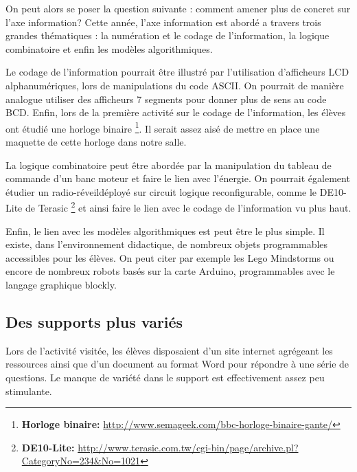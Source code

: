 \documentclass[pdftex,a4paper,12pt]{article}
\begin{document}
	On peut alors se poser la question suivante : comment amener plus de concret sur l'axe information?
	Cette année, l'axe information est abordé a travers trois grandes thématiques : la numération et le codage de l'information, la logique combinatoire 
	et enfin les modèles algorithmiques.

	Le codage de l'information pourrait être illustré par l'utilisation d'afficheurs LCD alphanumériques, lors de manipulations du code ASCII.
	On pourrait de manière analogue utiliser des afficheurs 7 segments pour donner plus de sens au code BCD.
	Enfin, lors de la première activité sur le codage de l'information, les élèves ont étudié une horloge binaire 
	\footnote{\textbf{Horloge binaire:} \url{http://www.semageek.com/bbc-horloge-binaire-gante/}}.
	Il serait assez aisé de mettre en place une maquette de cette horloge dans notre salle.

	La logique combinatoire peut être abordée par la manipulation du tableau de commande d'un banc moteur et faire le lien avec l'énergie.
	On pourrait également étudier un \og{}radio-réveil\fg{}déployé sur circuit logique reconfigurable, comme le DE10-Lite de Terasic 
	\footnote{\textbf{DE10-Lite:} \url{http://www.terasic.com.tw/cgi-bin/page/archive.pl?CategoryNo=234&No=1021}}
	et ainsi faire le lien avec le codage de l'information vu plus haut.

	Enfin, le lien avec les modèles algorithmiques est peut être le plus simple. 
	Il existe, dans l'environnement didactique, de nombreux objets programmables accessibles pour les élèves.
	On peut citer par exemple les Lego Mindstorms ou encore de nombreux robots basés sur la carte Arduino, programmables avec le langage graphique blockly.

	\subsection{Des supports plus variés}
	Lors de l'activité visitée, les élèves disposaient d'un site internet agrégeant les ressources ainsi que 
	d'un document au format Word pour répondre à une série de questions. 
	Le manque de variété dans le support est effectivement assez peu stimulante.
\end{document}
